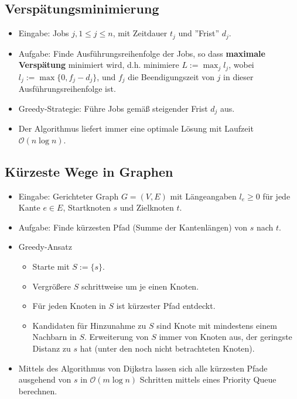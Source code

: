 \documentclass{scrartcl}
\begin{document}
\subsection{Verspätungsminimierung}

\begin{itemize}
	\item Eingabe: Jobs $ j, 1 \leq j \leq n $, mit Zeitdauer $ t_j $ und ''Frist'' $ d_j $.
	\item Aufgabe: Finde Ausführungsreihenfolge der Jobs, so dass \textbf{maximale Verspätung} minimiert wird, d.h. minimiere $ L := \max_j l_j $, wobei $ l_j := \max \{ 0, f_j - d_j \} $, und $ f_j $ die Beendigungszeit von $ j $ in dieser Ausführungsreihenfolge ist.
	\item Greedy-Strategie: Führe Jobs gemäß steigender Frist $ d_j $ aus.
	\item Der Algorithmus liefert immer eine optimale Lösung mit Laufzeit $ \mathcal{O}(n \log n) $.
\end{itemize}

\subsection{Kürzeste Wege in Graphen}

\begin{itemize}
	\item Eingabe: Gerichteter Graph $ G = (V,E) $ mit Längeangaben $ l_e \geq 0 $ für jede Kante $ e \in E $, Startknoten $ s $ und Zielknoten $ t $.
	\item Aufgabe: Finde kürzesten Pfad (Summe der Kantenlängen) von $ s $ nach $ t $.
	\item Greedy-Ansatz
	\begin{itemize}
		\item Starte mit $ S := \{ s \} $.
		\item Vergrößere $ S $ schrittweise um je einen Knoten.
		\item Für jeden Knoten in $ S $ ist kürzester Pfad entdeckt.
		\item Kandidaten für Hinzunahme zu $ S $ sind Knote mit mindestens einem Nachbarn in $ S $. Erweiterung von $ S $ immer von Knoten aus, der geringste Distanz zu $ s $ hat (unter den noch nicht betrachteten Knoten).
	\end{itemize}
	\item Mittels des Algorithmus von Dijkstra lassen sich alle kürzesten Pfade ausgehend von $ s $ in $ \mathcal{O}(m \log n) $ Schritten mittels eines Priority Queue berechnen.
\end{itemize}
\end{document}
